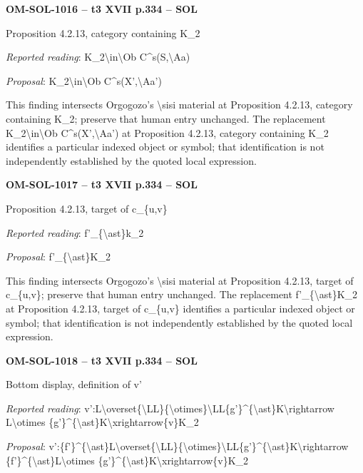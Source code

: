 \par\noindent\textbf{OM-SOL-1016 -- t3 XVII p.334 -- SOL}\par
Proposition 4.2.13, category containing K\_2\par
\emph{Reported reading}: K\_2\textbackslash{}in\textbackslash{}Ob C\textasciicircum{}s(S,\textbackslash{}Aa)\par
\emph{Proposal}: K\_2\textbackslash{}in\textbackslash{}Ob C\textasciicircum{}s(X',\textbackslash{}Aa')\par
This finding intersects Orgogozo's \textbackslash{}sisi material at Proposition 4.2.13, category containing K\_2; preserve that human entry unchanged. The replacement K\_2\textbackslash{}in\textbackslash{}Ob C\textasciicircum{}s(X',\textbackslash{}Aa') at Proposition 4.2.13, category containing K\_2 identifies a particular indexed object or symbol; that identification is not independently established by the quoted local expression.\par
\par\noindent\textbf{OM-SOL-1017 -- t3 XVII p.334 -- SOL}\par
Proposition 4.2.13, target of c\_\{u,v\}\par
\emph{Reported reading}: f'\_\{\textbackslash{}ast\}k\_2\par
\emph{Proposal}: f'\_\{\textbackslash{}ast\}K\_2\par
This finding intersects Orgogozo's \textbackslash{}sisi material at Proposition 4.2.13, target of c\_\{u,v\}; preserve that human entry unchanged. The replacement f'\_\{\textbackslash{}ast\}K\_2 at Proposition 4.2.13, target of c\_\{u,v\} identifies a particular indexed object or symbol; that identification is not independently established by the quoted local expression.\par
\par\noindent\textbf{OM-SOL-1018 -- t3 XVII p.334 -- SOL}\par
Bottom display, definition of v'\par
\emph{Reported reading}: v':L\textbackslash{}overset\{\textbackslash{}LL\}\{\textbackslash{}otimes\}\textbackslash{}LL\{g'\}\textasciicircum{}\{\textbackslash{}ast\}K\textbackslash{}rightarrow L\textbackslash{}otimes \{g'\}\textasciicircum{}\{\textbackslash{}ast\}K\textbackslash{}xrightarrow\{v\}K\_2\par
\emph{Proposal}: v':\{f'\}\textasciicircum{}\{\textbackslash{}ast\}L\textbackslash{}overset\{\textbackslash{}LL\}\{\textbackslash{}otimes\}\textbackslash{}LL\{g'\}\textasciicircum{}\{\textbackslash{}ast\}K\textbackslash{}rightarrow \{f'\}\textasciicircum{}\{\textbackslash{}ast\}L\textbackslash{}otimes \{g'\}\textasciicircum{}\{\textbackslash{}ast\}K\textbackslash{}xrightarrow\{v\}K\_2\par
